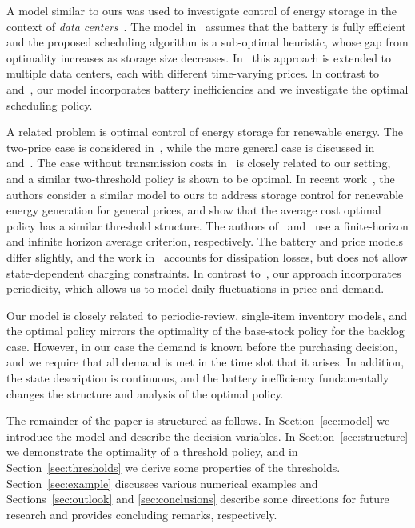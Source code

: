\documentclass[journal]{IEEEtran}
\newcommand\1{\mathbf{1}}
\begin{document}
A model similar to ours was used to investigate control of energy storage
in the context of {\em data centers}~\cite{UUNS11}.
The model in~\cite{UUNS11} assumes that the battery is fully efficient
and the proposed scheduling algorithm is a sub-optimal heuristic,
whose gap from optimality increases as storage size decreases. In~\cite{GDFW11} this approach is extended to multiple data centers, each with different time-varying prices.
In contrast to~\cite{UUNS11} and~\cite{GDFW11}, our model incorporates battery inefficiencies
and we investigate the optimal scheduling policy.

A related problem is optimal control of energy storage for renewable energy. The two-price case is considered in~\cite{HD11}, while the more general case is discussed in~\cite{ZSSS11} and~\cite{HD12}. The case without transmission costs in~\cite{ZSSS11} is closely related to our setting, and a similar two-threshold policy is shown to be optimal. In recent work~\cite{HD12}, the authors consider a similar model to ours to address storage control for renewable energy generation for general prices, and show that the average cost optimal policy has a similar threshold structure. The authors of~\cite{ZSSS11} and~\cite{HD12} use a finite-horizon and infinite horizon average criterion, respectively. The battery and price models differ slightly, and the work in~\cite{HD12} accounts for dissipation losses, but does not allow state-dependent charging constraints. In contrast to~\cite{HD12}, our approach incorporates periodicity, which allows us to model daily fluctuations in price and demand.

Our model is closely related to periodic-review, single-item inventory models, and the optimal policy mirrors the optimality of the base-stock policy for the backlog case. However, in our case the demand is known before the purchasing decision, and we require that all demand is met in the time slot that it arises. In addition, the state description is continuous, and the battery inefficiency fundamentally changes the structure and analysis of the optimal policy.






The remainder of the paper is structured as follows. In Section~\ref{sec:model} we introduce the model and describe the decision variables. In Section~\ref{sec:structure} we demonstrate the optimality of a threshold policy, and in Section~\ref{sec:thresholds} we derive some properties of the thresholds. Section~\ref{sec:example} discusses various numerical examples and Sections~\ref{sec:outlook} and \ref{sec:conclusions} describe some directions for future research and provides concluding remarks, respectively.
\end{document}
